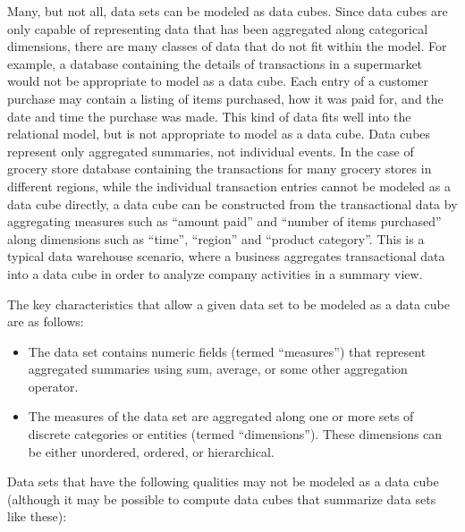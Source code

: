 \documentclass[12pt]{article}
\begin{document}
\begin{doublespace}
Many, but not all, data sets can be modeled as data cubes. Since data cubes are only capable of representing data that has been aggregated along categorical dimensions, there are many classes of data that do not fit within the model. For example, a database containing the details of transactions in a supermarket would not be appropriate to model as a data cube. Each entry of a customer purchase may contain a listing of items purchased, how it was paid for, and the date and time the purchase was made. This kind of data fits well into the relational model, but is not appropriate to model as a data cube. Data cubes represent only aggregated summaries, not individual events. In the case of grocery store database containing the transactions for many grocery stores in different regions, while the individual transaction entries cannot be modeled as a data cube directly, a data cube can be constructed from the transactional data by aggregating measures such as ``amount paid'' and ``number of items purchased'' along dimensions such as ``time'', ``region'' and ``product category''. This is a typical data warehouse scenario, where a business aggregates transactional data into a data cube in order to analyze company activities in a summary view.

The key characteristics that allow a given data set to be modeled as a data cube are as follows:

\begin{itemize}
\item The data set contains numeric fields (termed ``measures'') that represent aggregated summaries using sum, average, or some other aggregation operator.
\item The measures of the data set are aggregated along one or more sets of discrete categories or entities (termed ``dimensions''). These dimensions can be either unordered, ordered, or hierarchical.
\end{itemize}

Data sets that have the following qualities may not be modeled as a data cube (although it may be possible to compute data cubes that summarize data sets like these):


\end{doublespace}
\end{document}
